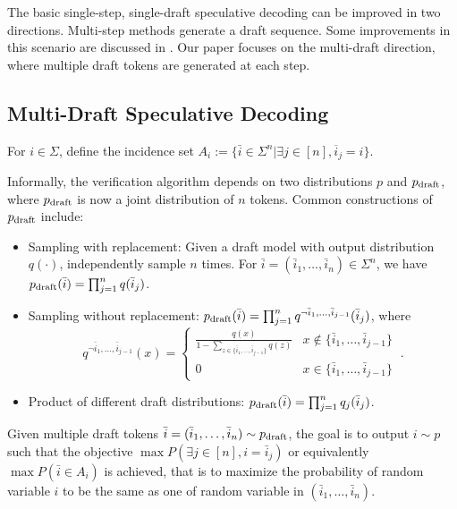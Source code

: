 \documentclass{article}
\makeatletter
\newcommand{\myvspace}{\@ifstar\myvspacestar\myvspacenostar}
\newcommand{\myvspacenostar}[1]{}
\newcommand{\myvspacestar}[1]{}
\newcommand{\crvspace}{\@ifstar\crvspacestar\crvspacenostar}
\newcommand{\crvspacenostar}[1]{}
\newcommand{\crvspacestar}[1]{}
\makeatother
\begin{document}
\myvspace{-8pt}
\crvspace{-5pt}
The basic single-step, single-draft speculative decoding can be improved in two directions. Multi-step methods generate a draft sequence. Some improvements \citep{sun2024optimal,huaccelerated,sunblock} in this scenario are discussed in . Our paper focuses on the multi-draft direction, where multiple draft tokens are generated at each step.

\myvspace{-7pt}
\crvspace{-7pt}
\subsection{Multi-Draft Speculative Decoding}\label{sec:back_mdsd}
\myvspace{-5pt}
\crvspace{-5pt}
For $i\in\Sigma$, define the incidence set $A_i:=\{\bar{i}\in \Sigma^n|\exists j\in[n], \overline{i}_j=i\}$.

Informally, the verification algorithm depends on two distributions $p$ and $p_{\operatorname{draft}}$, where $p_{\operatorname{draft}}$ is now a joint distribution of $n$ tokens. Common constructions of $p_{\operatorname{draft}}$ include:
\begin{itemize}[leftmargin=*,noitemsep=0mm,topsep=-2pt]
\item Sampling with replacement: Given a draft model with output distribution $q(\cdot)$, independently sample $n$ times. For $\bar{i}=(\bar{i}_1,\dots,\bar{i}_n)\in\Sigma^n$, we have $p_{\operatorname{draft}}(\bar{i})=\prod_{j=1}^n q(\bar{i}_j)$.
\item Sampling without replacement: $p_{\operatorname{draft}}(\bar{i})=\prod_{j=1}^n q^{\neg \bar{i}_1,\dots,\bar{i}_{j-1}}(\bar{i}_j)$, where
\begin{equation}
q^{\neg \bar{i}_1,\dots,\bar{i}_{j-1}}(x)=\begin{cases}\frac{q(x)}{1-\sum_{z\in\{\bar{i}_1,\dots,\bar{i}_{j-1}\}}q(z)}&x\notin\{\bar{i}_1,\dots,\bar{i}_{j-1}\}\\0&x\in\{\bar{i}_1,\dots,\bar{i}_{j-1}\}\end{cases}
~.
\end{equation}
\item Product of different draft distributions: $p_{\operatorname{draft}}(\bar{i})=\prod_{j=1}^n q_j(\bar{i}_j)$.
\end{itemize}

\myvspace{-4pt}
Given multiple draft tokens $\bar{i}=(\bar{i}_1,\dots,\bar{i}_n)\sim p_{\operatorname{draft}}$, the goal is to output $i\sim p$ such that the objective $\max P(\exists j\in[n], i=\bar{i}_j)$ or equivalently $\max P(\bar{i} \in A_i)$ is achieved, that is to maximize the probability of random variable $i$ to be the same as one of random variable in $(\bar{i}_1,\dots,\bar{i}_n)$.
\end{document}
